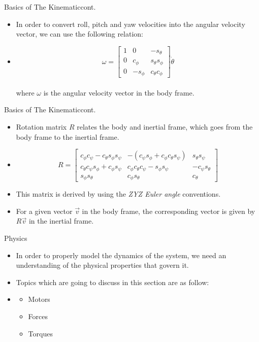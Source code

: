 \documentclass[8pt]{beamer}
\newcommand{\Ytri}{$\triangleright$ }
\renewcommand{\|}[1][.3em]{\hspace{#1}|\hspace{#1}}
\renewcommand{\,}[1][.3em]{,\hspace{#1}}
\newcommand{\subitem}{\item[\Ytri]}
\begin{document}
\begin{frame}{Basics of The Kinematic}{cont.}
    \begin{itemize}[<+->]
    \item In order to convert roll, pitch and yaw velocities into the angular velocity vector, we can use the following relation:
    \item[] \begin{equation}
    \omega = \begin{bmatrix}
    1 & 0 & -s_\theta\\
    0 & c_\phi & s_{\theta}s_\phi\\
    0 & -s_\phi & c_{\theta}c_\phi
    \end{bmatrix} \dot{\theta}
    \end{equation}\\ where $\omega$ is the angular velocity vector in the body frame.
    \end{itemize}
\end{frame}

\begin{frame}{Basics of The Kinematic}{cont.}
    \begin{itemize}[<+->]
    \item Rotation matrix $R$ relates the body and inertial frame, which goes from the body frame to the inertial frame.
    \item[] \begin{equation}
    R = \begin{bmatrix}
    c_{\phi}c_{\psi} - c_{\theta}s_{\phi}s_{\psi} & -(c_{\psi}s_{\phi} + c_{\phi}c_{\theta}s_{\psi}) & s_{\theta}s_{\psi}\\
    c_{\theta}c_{\psi}s_{\phi} + c_{\phi}s_{\psi} & c_{\phi}c_{\theta}c_{\psi} - s_{\phi}s_{\psi} & -c_{\psi}s_{\theta}\\
    s_{\phi}s_{\theta} & c_{\phi}s_{\theta} & c_{\theta}
    \end{bmatrix}
    \end{equation}
    \item This matrix is derived by using the \textit{ZYZ Euler angle} conventions.
    \item For a given vector $\vec{v}$ in the body frame, the corresponding vector is given by $R\vec{v}$ in the inertial frame.
    \end{itemize}
\end{frame}

\begin{frame}{Physics}
    \begin{itemize}%
    \item In order to properly model the dynamics of the system, we need an understanding of the physical properties that govern it.
    \item Topics which are going to discuss in this section are as follow:
    \item[] \begin{itemize}
        \subitem Motors
        \subitem Forces
        \subitem Torques
    \end{itemize}
    \end{itemize}
\end{frame}
\end{document}
